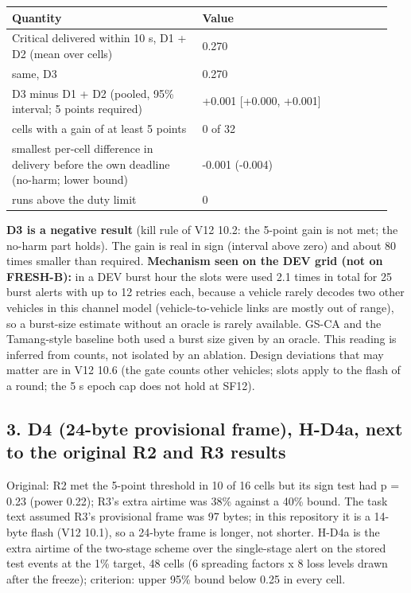 {\scriptsize\raggedright
\begin{longtable}{p{0.475\linewidth}p{0.475\linewidth}}
\toprule
Quantity & Value \\
\midrule
\endhead
Critical delivered within 10 s, D1 + D2 (mean over cells) & 0.270 \\
same, D3 & 0.270 \\
D3 minus D1 + D2 (pooled, 95\% interval; 5 points required) & +0.001 [+0.000, +0.001] \\
cells with a gain of at least 5 points & 0 of 32 \\
smallest per-cell difference in delivery before the own deadline (no-harm; lower bound) & -0.001 (-0.004) \\
runs above the duty limit & 0 \\
\bottomrule
\end{longtable}}

\textbf{D3 is a negative result} (kill rule of V12 10.2: the 5-point gain is not met; the no-harm part holds). The gain is real in sign (interval above zero) and about 80 times smaller than required. \textbf{Mechanism seen on the DEV grid (not on FRESH-B):} in a DEV burst hour the slots were used 2.1 times in total for 25 burst alerts with up to 12 retries each, because a vehicle rarely decodes two other vehicles in this channel model (vehicle-to-vehicle links are mostly out of range), so a burst-size estimate without an oracle is rarely available. GS-CA and the Tamang-style baseline both used a burst size given by an oracle. This reading is inferred from counts, not isolated by an ablation. Design deviations that may matter are in V12 10.6 (the gate counts other vehicles; slots apply to the flash of a round; the 5 s epoch cap does not hold at SF12).

\subsection*{3. D4 (24-byte provisional frame), H-D4a, next to the original R2 and R3 results}

Original: R2 met the 5-point threshold in 10 of 16 cells but its sign test had p = 0.23 (power 0.22); R3's extra airtime was 38\% against a 40\% bound. The task text assumed R3's provisional frame was 97 bytes; in this repository it is a 14-byte flash (V12 10.1), so a 24-byte frame is longer, not shorter. H-D4a is the extra airtime of the two-stage scheme over the single-stage alert on the stored test events at the 1\% target, 48 cells (6 spreading factors x 8 loss levels drawn after the freeze); criterion: upper 95\% bound below 0.25 in every cell.

